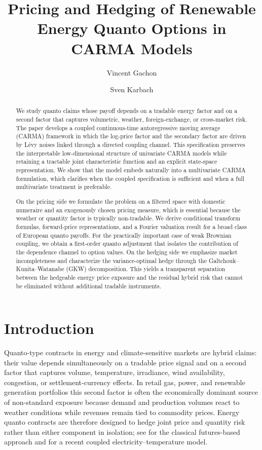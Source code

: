 \documentclass[10pt,a4paper,reqno]{amsart}
\title[Pricing and Hedging of Quantos in CARMA Models]{Pricing and Hedging of Renewable Energy Quanto Options in CARMA Models}
\author{Vincent Gachon}
\author{Sven Karbach}
\newcommand{\1}{\mathbbm{1}}
\begin{document}
\begin{abstract}
We study quanto claims whose payoff depends on a tradable energy factor and on a
second factor that captures volumetric, weather, foreign-exchange, or
cross-market risk. The paper develops a coupled continuous-time autoregressive
moving average (CARMA) framework in which the log-price factor and the secondary
factor are driven by Lévy noises linked through a directed coupling channel.
This specification preserves the interpretable low-dimensional structure of
univariate CARMA models while retaining a tractable joint characteristic
function and an explicit state-space representation. We show that the model
embeds naturally into a multivariate CARMA formulation, which clarifies when
the coupled specification is sufficient and when a full multivariate treatment
is preferable.

On the pricing side we formulate the problem on a filtered space with domestic
numeraire and an exogenously chosen pricing measure, which is essential because
the weather or quantity factor is typically non-tradable. We derive conditional
transform formulas, forward-price representations, and a Fourier valuation
result for a broad class of European quanto payoffs. For the practically
important case of weak Brownian coupling, we obtain a first-order quanto
adjustment that isolates the contribution of the dependence channel to option
values. On the hedging side we emphasize market incompleteness and characterize
the variance-optimal hedge through the Galtchouk--Kunita--Watanabe (GKW)
decomposition. This yields a transparent separation between the hedgeable energy
price exposure and the residual hybrid risk that cannot be eliminated without
additional tradable instruments.
\end{abstract}

\maketitle

\section{Introduction}\label{sec:introduction}

Quanto-type contracts in energy and climate-sensitive markets are hybrid claims:
their value depends simultaneously on a tradable price signal and on a second
factor that captures volume, temperature, irradiance, wind availability,
congestion, or settlement-currency effects. In retail gas, power, and renewable
generation portfolios this second factor is often the economically dominant
source of non-standard exposure because demand and production volumes react to
weather conditions while revenues remain tied to commodity prices. Energy quanto
contracts are therefore designed to hedge joint price and quantity risk rather
than either component in isolation; see \citet{Ben15} for the classical
futures-based approach and \citet{Alf24} for a recent coupled
electricity--temperature model.
\end{document}
